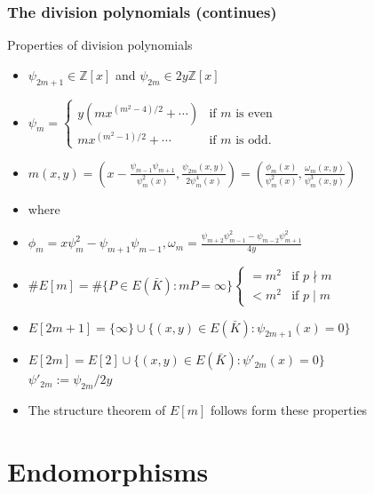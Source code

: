 \documentclass[10pt,final]{beamer} %
\newcommand{\Z}{\mathbb Z}
\theoremstyle{definition}
\begin{document}
\begin{frame}
\frametitle{The division polynomials (continues)}
 
\begin{block}{Properties of division polynomials}
\begin{itemize}[<+-| alert@+>]
  \item $\psi_{2m+1}\in\Z[x]$  and $\psi_{2m}\in 2y\Z[x]$ 
 \item $\psi_m=\begin{cases} y(mx^{(m^2-4)/2}+\cdots) &\text{if $m$ is even}\\
 mx^{(m^2-1)/2}+\cdots &\text{if $m$ is odd.}\end{cases}$
  \item $m(x,y)=\left(x - \frac {\psi_{m-1} \psi_{m+1}}{\psi_{m}^{2}(x)}, \frac{\psi_{2 m}(x,y)}{2\psi_{m}^{4}(x)} \right)=\left ( \frac{\phi_{m}(x)}{\psi_{m}^{2}(x)}, \frac{\omega_{m}(x,y)}{\psi^{3}_{m}(x,y)} \right)
 $
 \item[] where
 \item[]  $\phi_{m}=x\psi_{m}^{2} - \psi_{m+1}\psi_{m-1},\omega_{m}=\frac{\psi_{m+2}\psi_{m-1}^{2}-\psi_{m-2}\psi_{m+1}^{2}}{4y}$
 \item $\#E[m]=\#\{P\in E(\bar{K}): mP=\infty\}\begin{cases}=m^2&\text{if }p\nmid m\\
<m^2&\text{if }p\mid m\end{cases}$
\item $E[2m+1]=\{\infty\}\cup\{(x,y)\in E(\bar{K}): \psi_{2m+1}(x)=0\}$
\item $E[2m]=E[2]\cup\{(x,y)\in E(\bar{K}): \psi'_{2m}(x)=0\}$\\ \qquad\hfill $\psi'_{2m}:=\psi_{2m}/2y$
 \item The structure theorem of $E[m]$ follows form these properties
\end{itemize}
 \end{block}
 \end{frame}
 
\section{Endomorphisms}
\end{document}
